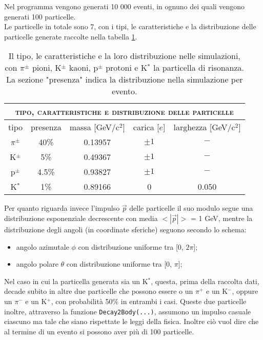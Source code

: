 Nel programma vengono generati 10 000 eventi, in ognuno dei quali vengono generati 100 particelle.\\
Le particelle in totale sono 7, con i tipi, le caratteristiche e la distribuzione delle particelle generate raccolte nella tabella \ref{tab:particles}.

\begin{table}[htp]
    \centering
    \begin{tabular}{||c|c|c|c|c||}
        \hline \hline
        \multicolumn{5}{||c||}{\textsc{tipo, caratteristiche e distribuzione delle particelle}} \\
        \hline \hline
        tipo & presenza & massa [GeV/c$^2$] & carica [$e$] & larghezza [GeV/c$^2$]\\
        \hline
        $\pi^\pm$ & 40\% & 0.13957 & $\pm1$ & $-$\\
        K$^\pm$ & 5\% & 0.49367 & $\pm1$ & $-$\\
        p$^\pm$ & 4.5\% & 0.93827 & $\pm1$ & $-$\\
        K$^*$ & 1\% & 0.89166 & 0 & 0.050\\
        \hline \hline 
    \end{tabular}
    \caption[\small Tipo, caratteristiche e distribuzione delle particelle]{\small Il tipo, le caratteristiche e la loro distribuzione nelle simulazioni, con $\pi^\pm$ pioni, K$^\pm$ kaoni, p$^\pm$ protoni e  K$^*$ la particella di risonanza. La sezione "presenza" indica la distribuzione nella simulazione per evento.}
    \label{tab:particles}
\end{table}
Per quanto riguarda invece l'impulso $\Vec{p}$ delle particelle il suo modulo segue una distribuzione esponenziale decrescente con media $<|\Vec{p}|>$ = 1 GeV, mentre la distribuzione degli angoli (in coordinate sferiche) seguono secondo lo schema:
\begin{itemize}
    \item angolo azimutale $\phi$ con distribuzione uniforme tra [0, $2\pi$];
    \item angolo polare $\theta$ con distribuzione uniforme tra [0, $\pi$];
\end{itemize}
Nel caso in cui la particella generata sia un K$^*$, questa, prima della raccolta dati, decade subito in altre due particelle che possono essere o un $\pi^+$ e un K$^-$, oppure un $\pi^-$ e un K$^+$, con probabilità 50\% in entrambi i casi. Queste due particelle inoltre, attraverso la funzione \verb|Decay2Body(...)|, assumono un impulso casuale ciascuno ma tale che siano rispettate le leggi della fisica. Inoltre ciò vuol dire che al termine di un evento si possono aver più di 100 particelle. 